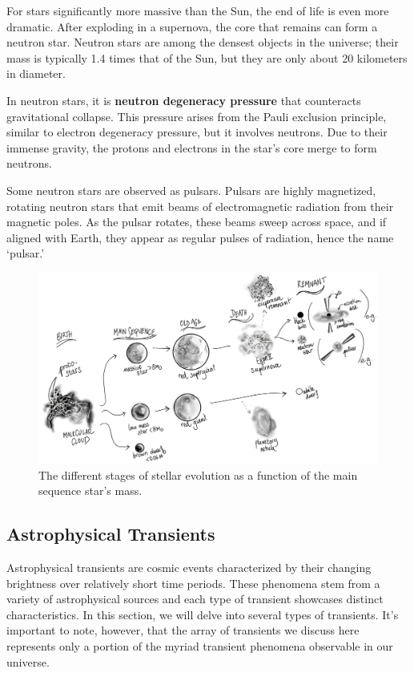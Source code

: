 For stars significantly more massive than the Sun, the end of life is even more dramatic. After exploding in a supernova, the core that remains can form a neutron star. Neutron stars are among the densest objects in the universe; their mass is typically 1.4 times that of the Sun, but they are only about 20 kilometers in diameter.

In neutron stars, it is \textbf{neutron degeneracy pressure} that counteracts gravitational collapse. This pressure arises from the Pauli exclusion principle, similar to electron degeneracy pressure, but it involves neutrons. Due to their immense gravity, the protons and electrons in the star's core merge to form neutrons.

Some neutron stars are observed as pulsars. Pulsars are highly magnetized, rotating neutron stars that emit beams of electromagnetic radiation from their magnetic poles. As the pulsar rotates, these beams sweep across space, and if aligned with Earth, they appear as regular pulses of radiation, hence the name `pulsar.'



\begin{figure}[h!]
    \centering
    \includegraphics[width=\linewidth]{img/stellar_cycle.png}
    \caption{The different stages of stellar evolution as a function of the main sequence star's mass.}
    \label{fig:stellar_cycle}
\end{figure}


\subsection{Astrophysical Transients}

Astrophysical transients are cosmic events characterized by their changing brightness over relatively short time periods. These phenomena stem from a variety of astrophysical sources and each type of transient showcases distinct characteristics. In this section, we will delve into several types of transients. It's important to note, however, that the array of transients we discuss here represents only a portion of the myriad transient phenomena observable in our universe.

